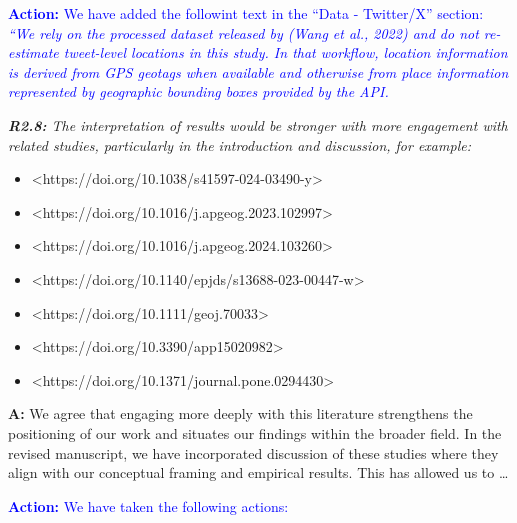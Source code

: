 \documentclass[
  letterpaper,
  DIV=11,
  numbers=noendperiod]{scrartcl}
\begin{document}
\setlength{\leftskip}{0.5cm}\textcolor{blue}{\textbf{Action:} We have added the followint text in the ``Data - Twitter/X'' section: \textit{``We rely on the processed dataset released by (Wang et al., 2022) and do not re-estimate tweet-level locations in this study. In that workflow, location information is derived from GPS geotags when available and otherwise from place information represented by geographic bounding boxes provided by the API.}}

\setlength{\leftskip}{0cm}\textit{\textbf{R2.8:} The interpretation of results would be stronger with more engagement with related studies, particularly in the introduction and discussion, for example:}

\vspace{-3mm} \begin{itemize}[noitemsep, topsep=0pt]
\item <https://doi.org/10.1038/s41597-024-03490-y>  \item <https://doi.org/10.1016/j.apgeog.2023.102997> 
\item <https://doi.org/10.1016/j.apgeog.2024.103260>  \item <https://doi.org/10.1140/epjds/s13688-023-00447-w>  
\item <https://doi.org/10.1111/geoj.70033>
\item <https://doi.org/10.3390/app15020982> 
\item <https://doi.org/10.1371/journal.pone.0294430>
\end{itemize}

\setlength{\leftskip}{0.5cm}\textbf{A:} We agree that engaging more
deeply with this literature strengthens the positioning of our work and
situates our findings within the broader field. In the revised
manuscript, we have incorporated discussion of these studies where they
align with our conceptual framing and empirical results. This has
allowed us to \ldots{}

\setlength{\leftskip}{0.5cm}\textcolor{blue}{\textbf{Action:} We have taken the following actions:}
\end{document}
